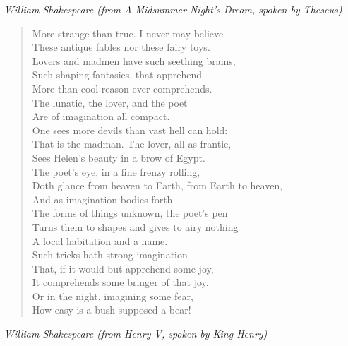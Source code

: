 \documentclass[10pt]{memoir}
\newcommand{\poemauthor}[1]{{\small\itshape #1}\par\medskip}
\begin{document}
\poemauthor{William Shakespeare (from \textit{A Midsummer Night's Dream}, spoken by Theseus)}

\begin{verse}
More strange than true. I never may believe\\
These antique fables nor these fairy toys.\\
Lovers and madmen have such seething brains,\\
Such shaping fantasies, that apprehend\\
More than cool reason ever comprehends.\\
The lunatic, the lover, and the poet\\
Are of imagination all compact.\\
One sees more devils than vast hell can hold:\\
That is the madman. The lover, all as frantic,\\
Sees Helen's beauty in a brow of Egypt.\\
The poet's eye, in a fine frenzy rolling,\\
Doth glance from heaven to Earth, from Earth to heaven,\\
And as imagination bodies forth\\
The forms of things unknown, the poet's pen\\
Turns them to shapes and gives to airy nothing\\
A local habitation and a name.\\
Such tricks hath strong imagination\\
That, if it would but apprehend some joy,\\
It comprehends some bringer of that joy.\\
Or in the night, imagining some fear,\\
How easy is a bush supposed a bear!
\end{verse}

\poemauthor{William Shakespeare (from \textit{Henry V}, spoken by King Henry)}
\end{document}
